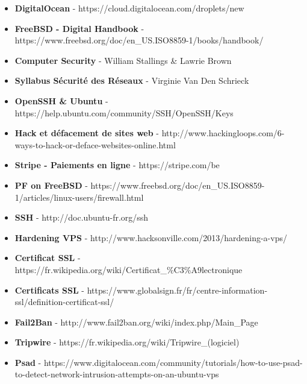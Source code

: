 \documentclass[a4paper,10pt,final,fleqn]{article}
\begin{document}
			\begin{itemize}
				\item \textbf{DigitalOcean} - https://cloud.digitalocean.com/droplets/new
				\item \textbf{FreeBSD - Digital Handbook} - https://www.freebsd.org/doc/en\_US.ISO8859-1/books/handbook/
				\item \textbf{Computer Security} - William Stallings \& Lawrie Brown
				\item \textbf{Syllabus Sécurité des Réseaux} - Virginie Van Den Schrieck
				\item \textbf{OpenSSH \& Ubuntu} - https://help.ubuntu.com/community/SSH/OpenSSH/Keys
				\item \textbf{Hack et défacement de sites web} - http://www.hackingloops.com/6-ways-to-hack-or-deface-websites-online.html
				\item \textbf{Stripe - Paiements en ligne} - https://stripe.com/be
				\item \textbf{PF on FreeBSD} - https://www.freebsd.org/doc/en\_US.ISO8859-1/articles/linux-users/firewall.html
				\item \textbf{SSH} - http://doc.ubuntu-fr.org/ssh
				\item \textbf{Hardening VPS} - http://www.hacksonville.com/2013/hardening-a-vps/
				\item \textbf{Certificat SSL} - https://fr.wikipedia.org/wiki/Certificat\_\%C3\%A9lectronique
				\item \textbf{Certificats SSL} - https://www.globalsign.fr/fr/centre-information-ssl/definition-certificat-ssl/
				\item \textbf{Fail2Ban} - http://www.fail2ban.org/wiki/index.php/Main\_Page
				\item \textbf{Tripwire} - https://fr.wikipedia.org/wiki/Tripwire\_(logiciel)
				\item \textbf{Psad} - https://www.digitalocean.com/community/tutorials/how-to-use-psad-to-detect-network-intrusion-attempts-on-an-ubuntu-vps
			\end{itemize}

	
\end{document}
